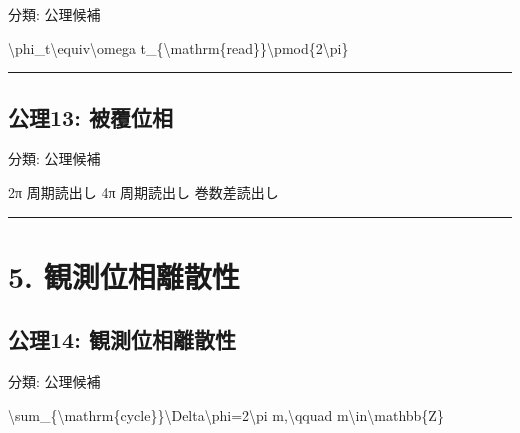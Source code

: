 \documentclass[
  a4paper]{ltjsarticle}
\newenvironment{Shaded}{}{}
\newcommand{\NormalTok}[1]{#1}
\begin{document}
分類: 公理候補

\begin{Shaded}
\begin{Highlighting}[]
\NormalTok{\textbackslash{}phi\_t\textbackslash{}equiv\textbackslash{}omega t\_\{\textbackslash{}mathrm\{read\}\}\textbackslash{}pmod\{2\textbackslash{}pi\}}
\end{Highlighting}
\end{Shaded}

\begin{center}\rule{0.5\linewidth}{0.5pt}\end{center}

\subsection{公理13:
被覆位相}\label{ux516cux740613-ux88abux8986ux4f4dux76f8}

分類: 公理候補

\begin{Shaded}
\begin{Highlighting}[]
\NormalTok{2π 周期読出し}
\NormalTok{4π 周期読出し}
\NormalTok{巻数差読出し}
\end{Highlighting}
\end{Shaded}

\begin{center}\rule{0.5\linewidth}{0.5pt}\end{center}

\section{5.
観測位相離散性}\label{ux89b3ux6e2cux4f4dux76f8ux96e2ux6563ux6027}

\subsection{公理14:
観測位相離散性}\label{ux516cux740614-ux89b3ux6e2cux4f4dux76f8ux96e2ux6563ux6027}

分類: 公理候補

\begin{Shaded}
\begin{Highlighting}[]
\NormalTok{\textbackslash{}sum\_\{\textbackslash{}mathrm\{cycle\}\}\textbackslash{}Delta\textbackslash{}phi=2\textbackslash{}pi m,\textbackslash{}qquad m\textbackslash{}in\textbackslash{}mathbb\{Z\}}
\end{Highlighting}
\end{Shaded}
\end{document}
